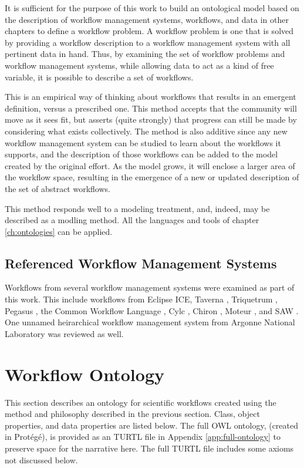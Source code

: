 It is sufficient for the purpose of this work to build an ontological model
based on the description of workflow management systems, workflows, and data in
other chapters to define a workflow problem. A workflow problem is one that is
solved by providing a workflow description to a workflow management system with
all pertinent data in hand. Thus, by examining the set of workflow problems and
workflow management systems, while allowing data to act as a kind of free
variable, it is possible to describe a set of workflows. 

This is an empirical way of thinking about workflows that results in an emergent
definition, versus a prescribed one. This method accepts that the community will
move as it sees fit, but asserts (quite strongly) that progress can still be
made by considering what exists collectively. The method is also additive since
any new workflow management system can be studied to learn about the
workflows it supports, and the description of those workflows can be added to
the model created by the original effort. As the model grows, it will enclose a
larger area of the workflow space, resulting in the emergence of a new or
updated description of the set of abstract workflows.

This method responds well to a modeling treatment, and, indeed, may be described
as a modling method. All the languages and tools of chapter \ref{ch:ontologies}
can be applied.

\subsection{Referenced Workflow Management Systems}

Workflows from several workflow management systems were examined as part of this
work. This include workflows from Eclipse ICE, Taverna \cite{taverna},
Triquetrum \cite{triquetrum}, Pegasus \cite{pegasus}, the Common Workflow
Language \cite{cwl}, Cylc \cite{cylc}, Chiron \cite{chiron}, Moteur
\cite{Moteur}, and SAW \cite{SAW}. One unnamed heirarchical workflow management
system from Argonne National Laboratory was reviewed as well.

\section{Workflow Ontology}
\label{workflow-ont-section}

This section describes an ontology for scientific workflows created using the
method and philosophy described in the previous section. Class, object
properties, and data properties are listed below. The full OWL ontology,
(created in Prot\'eg\'e), is provided as an TURTL file in Appendix
\ref{app:full-ontology} to preserve space for the narrative here. The full
TURTL file includes some axioms not discussed below. 

